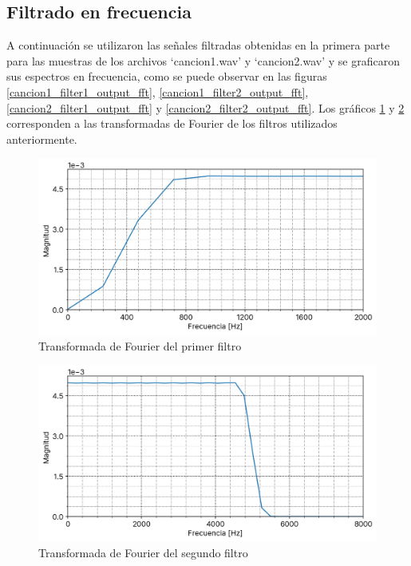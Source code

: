 \documentclass[12pt]{article}
\begin{document}
\hypertarget{filtrado}{%
\subsection{Filtrado en frecuencia}\label{filtrado}}

A continuación se utilizaron las señales filtradas obtenidas en la primera parte para las muestras de los archivos `cancion1.wav' y `cancion2.wav' y se graficaron sus espectros en frecuencia, como se puede observar en las figuras \ref{cancion1_filter1_output_fft}, \ref{cancion1_filter2_output_fft}, \ref{cancion2_filter1_output_fft} y \ref{cancion2_filter2_output_fft}. Los gráficos \ref{filter1_h_fft} y \ref{filter2_h_fft} corresponden a las transformadas de Fourier de los filtros utilizados anteriormente.

\begin{figure}[H]
\centering
\includegraphics{plot/filter1_h_fft.png}
\caption{Transformada de Fourier del primer filtro}
\label{filter1_h_fft}
\end{figure}

\begin{figure}[H]
\centering
\includegraphics{plot/filter2_h_fft.png}
\caption{Transformada de Fourier del segundo filtro}
\label{filter2_h_fft}
\end{figure}
\end{document}
